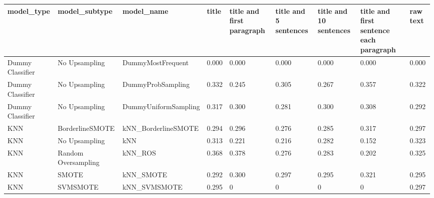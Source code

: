 \begin{tabular}{lllllllll}
\toprule
                  model\_type &       model\_subtype &                                   model\_name & title & title and first paragraph & title and 5 sentences & title and 10 sentences & title and first sentence each paragraph & raw text \\
\midrule
            Dummy Classifier &       No Upsampling &                            DummyMostFrequent & 0.000 &                     0.000 &                 0.000 &                  0.000 &                                   0.000 &    0.000 \\
            Dummy Classifier &       No Upsampling &                            DummyProbSampling & 0.332 &                     0.245 &                 0.305 &                  0.267 &                                   0.357 &    0.322 \\
            Dummy Classifier &       No Upsampling &                         DummyUniformSampling & 0.317 &                     0.300 &                 0.281 &                  0.300 &                                   0.308 &    0.292 \\
                         KNN &     BorderlineSMOTE &                          kNN\_BorderlineSMOTE & 0.294 &                     0.296 &                 0.276 &                  0.285 &                                   0.317 &    0.297 \\
                         KNN &       No Upsampling &                                          kNN & 0.313 &                     0.221 &                 0.216 &                  0.282 &                                   0.152 &    0.323 \\
                         KNN & Random Oversampling &                                      kNN\_ROS & 0.368 &                     0.378 &                 0.276 &                  0.283 &                                   0.202 &    0.325 \\
                         KNN &               SMOTE &                                    kNN\_SMOTE & 0.292 &                     0.300 &                 0.297 &                  0.295 &                                   0.321 &    0.295 \\
                         KNN &            SVMSMOTE &                                 kNN\_SVMSMOTE & 0.295 &                         0 &                     0 &                      0 &                                       0 &    0.297 \\

\end{tabular}
